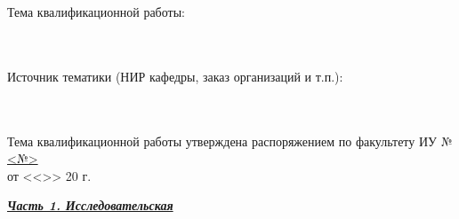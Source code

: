 \documentclass[14pt, left=25mm, right=15mm, top=20mm, bottom=10mm]{templateTaskBMSTU}
\begin{document}
	\begin{flushleft}
		\fontsize{12pt}{\baselineskip}\selectfont

		Тема квалификационной работы: \uline{ \hfill}
		\\ \uline{ \hfill}
		\\ \uline{ \hfill}
		\\ \uline{ \hfill}
	\end{flushleft}

	\vfill

	\begin{flushleft}
		\fontsize{12pt}{\baselineskip}\selectfont

		Источник тематики (НИР кафедры, заказ организаций и т.п.): 
		\\ \uline{\hfill}
		\\ \uline{\hfill}
		\\ \uline{\hfill}
	\end{flushleft}

	\vfill

	\begin{flushleft}
		\fontsize{12pt}{\baselineskip}\selectfont
		Тема квалификационной работы утверждена распоряжением по факультету ИУ № \uline{\hfill <№> \hfill}
		\\ от <<\uline{\hspace*{5mm}}>> \uline{\hspace*{2.5cm}} 20\uline{\hspace*{5mm}} г.
	\end{flushleft}

	\vfill

	\begin{flushleft}
		\fontsize{12pt}{\baselineskip}\selectfont

		\textbf{\uline{\textit{Часть 1. Исследовательская}}}
		
		\uline{\hfill}
		
		\uline{\hfill}
		
		\uline{\hfill}

		\uline{\hfill}

		\uline{\hfill}

		\uline{\hfill}

		\uline{\hfill}

		\uline{\hfill}

		\uline{\hfill}
	\end{flushleft}

	\pagebreak

	\thispagestyle{empty}
\end{document}
